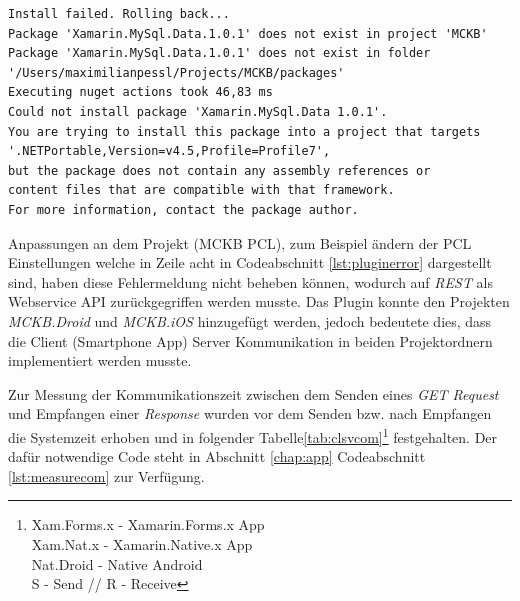 	\begin{lstlisting}[caption={Fehlermeldung - Plugin Installation},label={lst:pluginerror},captionpos=b,style=SQL-Michalstyle]
Install failed. Rolling back...
Package 'Xamarin.MySql.Data.1.0.1' does not exist in project 'MCKB'
Package 'Xamarin.MySql.Data.1.0.1' does not exist in folder 
'/Users/maximilianpessl/Projects/MCKB/packages'
Executing nuget actions took 46,83 ms
Could not install package 'Xamarin.MySql.Data 1.0.1'. 
You are trying to install this package into a project that targets 
'.NETPortable,Version=v4.5,Profile=Profile7', 
but the package does not contain any assembly references or 
content files that are compatible with that framework. 
For more information, contact the package author.
	\end{lstlisting}

	Anpassungen an dem Projekt (MCKB PCL), zum Beispiel ändern der PCL Einstellungen welche in Zeile acht in Codeabschnitt \ref{lst:pluginerror} dargestellt sind, haben diese Fehlermeldung nicht beheben können, wodurch auf \textit{REST} als Webservice API zurückgegriffen werden musste. Das Plugin konnte den Projekten \textit{MCKB.Droid} und \textit{MCKB.iOS} hinzugefügt werden, jedoch bedeutete dies, dass die Client (Smartphone App) Server Kommunikation in beiden Projektordnern implementiert werden musste.

	Zur Messung der Kommunikationszeit zwischen dem Senden eines \textit{GET Request} und Empfangen einer \textit{Response} wurden vor dem Senden bzw. nach Empfangen die Systemzeit erhoben und in folgender Tabelle\ref{tab:clsvcom}\footnote{Xam.Forms.x - Xamarin.Forms.x App \\Xam.Nat.x - Xamarin.Native.x App \\Nat.Droid - Native Android\\ S - Send // R - Receive} festgehalten. Der dafür notwendige Code steht in Abschnitt \ref{chap:app} Codeabschnitt \ref{lst:measurecom} zur Verfügung.

